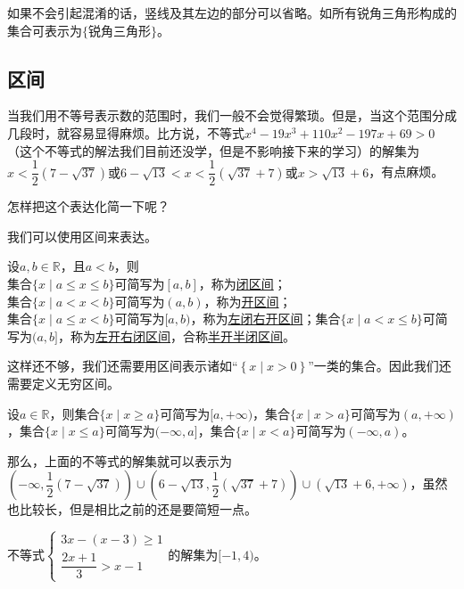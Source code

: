 \documentclass[lang=cn,math=cm,chinesefont=nofont,11pt,scheme=chinese,twocol]{elegantbook}
\begin{document}
如果不会引起混淆的话，竖线及其左边的部分可以省略。如所有锐角三角形构成的集合可表示为$\{\text{锐角三角形}\}$。

\subsection{区间}
当我们用不等号表示数的范围时，我们一般不会觉得繁琐。但是，当这个范围分成几段时，就容易显得麻烦。比方说，不等式$x^4-19x^3+110x^2-197x+69>0$（这个不等式的解法我们目前还没学，但是不影响接下来的学习）的解集为$x<\dfrac{1}{2} \left(7-\sqrt{37}\right)\text{或}6-\sqrt{13}<x<\dfrac{1}{2} \left(\sqrt{37}+7\right)\text{或}x>\sqrt{13}+6$，有点麻烦。

怎样把这个表达化简一下呢？

我们可以使用区间来表达。

\begin{definition}[区间]
	设$a,b\in\mathbb{R}$，且$a<b$，则\\集合$\{x\mid a\leq x\leq b\}$可简写为$[a,b]$，称为\underline{闭区间}；\\集合$\{x\mid a<x<b\}$可简写为$(a,b)$，称为\underline{开区间}；\\集合$\{x\mid a\leq x<b\}$可简写为$[a,b)$，称为\underline{左闭右开区间}；集合$\{x\mid a< x\leq b\}$可简写为$(a,b]$，称为\underline{左开右闭区间}，合称\underline{半开半闭区间}。
\end{definition}

这样还不够，我们还需要用区间表示诸如“$\left\{x\mid x>0\right\}$”一类的集合。因此我们还需要定义无穷区间。

\begin{definition}[无穷区间]
    设$a\in\mathbb{R}$，则集合$\{x\mid x\geq a\}$可简写为$[a,+\infty)$，集合$\{x\mid x>a\}$可简写为$(a,+\infty)$，集合$\{x\mid x\leq a\}$可简写为$(-\infty,a]$，集合$\{x\mid x<a\}$可简写为$(-\infty,a)$。
\end{definition}

那么，上面的不等式的解集就可以表示为$(-\infty,\dfrac{1}{2} \left(7-\sqrt{37}\right))\cup (6-\sqrt{13},\dfrac{1}{2} \left(\sqrt{37}+7\right))\cup (\sqrt{13}+6,+\infty)$，虽然也比较长，但是相比之前的还是要简短一点。

\begin{example}
  不等式$\begin{cases}3x-(x-3)\geqslant1\\\dfrac{2x+1}{3}>x-1\end{cases}$的解集为$[-1,4)$。
\end{example}
\end{document}
